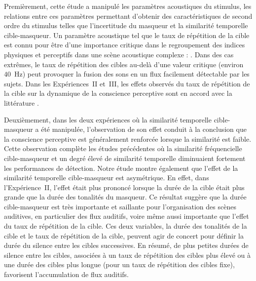 Premièrement, cette étude a manipulé les paramètres acoustiques du stimulus, les relations entre ces paramètres permettant d'obtenir des caractéristiques de second ordre du stimulus telles que l'incertitude du masqueur et la similarité temporelle cible-masqueur. 
Un paramètre acoustique tel que le taux de répétition de la cible est connu pour être d'une importance critique dans le regroupement des indices physiques et perceptifs dans une scène acoustique complexe : \citep{miller2002spectrotemporal, moore2002factors}. 
Dans des cas extrêmes, le taux de répétition des cibles au-delà d'une valeur critique (environ $40$~Hz) peut provoquer la fusion des sons en un flux facilement détectable par les sujets. 
Dans les Expériences~II et~III, les effets observés du taux de répétition de la cible sur la dynamique de la conscience perceptive sont en accord avec la littérature \citep{xiang2010competing, akram2014investigating}.

Deuxièmement, dans les deux expériences où la similarité temporelle cible-masqueur a été manipulée, l'observation de son effet conduit à la conclusion que la conscience perceptive est généralement renforcée lorsque la similarité est faible. 
Cette observation complète les études précédentes où la similarité fréquencielle cible-masqueur \citep{kidd2002similarity} et un degré élevé de similarité temporelle \citep{durlach2003informational} diminuaient fortement les performances de détection. 
Notre étude montre également que l'effet de la similarité temporelle cible-masqueur est asymétrique. 
En effet, dans l'Expérience~II, l'effet était plus prononcé lorsque la durée de la cible était plus grande que la durée des tonalités du masqueur. 
Ce résultat suggère que la durée cible-masqueur est très importante et saillante pour l'organisation des scènes auditives, en particulier des flux auditifs, voire même aussi importante que l'effet du taux de répétition de la cible. 
Ces deux variables, la durée des tonalités de la cible et le taux de répétition de la cible, peuvent agir de concert pour définir la durée du silence entre les cibles successives. 
En résumé, de plus petites durées de silence entre les cibles, associées à un taux de répétition des cibles plus élevé ou à une durée des cibles plus longue (pour un taux de répétition des cibles fixe), favorisent l'accumulation de flux auditifs.

